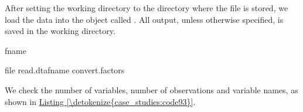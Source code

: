 \documentclass[letterpaper,10pt,english]{sphinxmanual}
\begin{document}
After setting the working directory to the directory where the 
file is stored, we load the data into the object called . All
output, unless otherwise specified, is saved in the working directory.

\def\sphinxLiteralBlockLabel{\label{\detokenize{case_studies:code92}}}
%
\begin{sphinxVerbatim}[commandchars=\\\{\},numbers=left,firstnumber=1,stepnumber=1]

fname  

file  read.dtafname convert.factors   
\end{sphinxVerbatim}

We check the number of variables, number of observations and variable
names, as shown in \hyperref[\detokenize{case_studies:code93}]{Listing \ref{\detokenize{case_studies:code93}}}.
\end{document}
